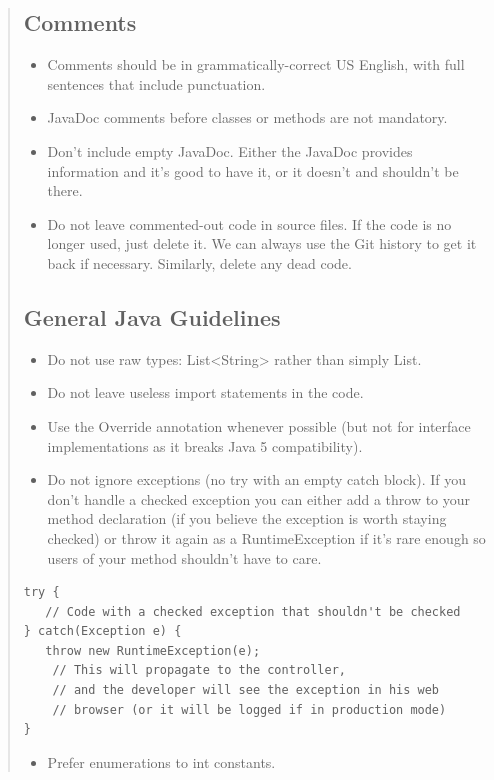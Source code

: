 \documentclass[11pt]{book}
\begin{document}
\begin{quotation}
\subsection{Comments}
\begin{itemize}
    \item Comments should be in grammatically-correct US English, with full sentences that include punctuation.
    \item JavaDoc comments before classes or methods are not mandatory.
    \item Don't include empty JavaDoc. Either the JavaDoc provides information and it's good to have it, or it doesn't and shouldn't be there.
    \item Do not leave commented-out code in source files. If the code is no longer used, just delete it. We can always use the Git history to get it back if necessary. Similarly, delete any dead code.
\end{itemize}

\subsection{General Java Guidelines}
\begin{itemize}
    \item Do not use raw types: List<String> rather than simply List.
    \item Do not leave useless import statements in the code.
    \item Use the Override annotation whenever possible (but not for interface implementations as it breaks Java 5 compatibility).
    \item Do not ignore exceptions (no try with an empty catch block). If you don't handle a checked exception you can either add a throw to your method declaration (if you believe the exception is worth staying checked) or throw it again as a RuntimeException if it's rare enough so users of your method shouldn't have to care.
\end{itemize}
\begin{lstlisting}[frame=single]
try {
   // Code with a checked exception that shouldn't be checked
} catch(Exception e) {
   throw new RuntimeException(e);
    // This will propagate to the controller,
    // and the developer will see the exception in his web
    // browser (or it will be logged if in production mode)
}
\end{lstlisting}
\begin{itemize}
    \item Prefer enumerations to int constants.
\end{itemize}
\end{quotation}
\end{document}
